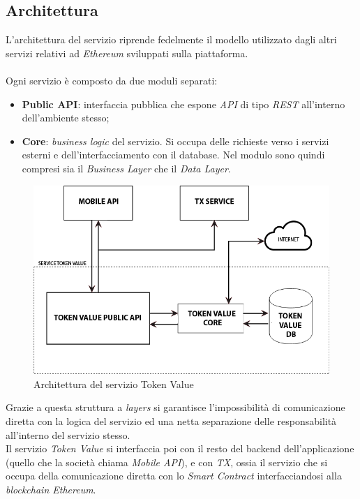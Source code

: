 \documentclass[11pt]{thesistemp}
\begin{document}
\subsection{Architettura}

L'architettura del servizio riprende fedelmente il modello utilizzato dagli altri servizi relativi ad \textit{Ethereum} sviluppati sulla piattaforma.\\\\
Ogni servizio è composto da due moduli separati:
\begin{itemize}
	\item \textbf{Public API}: interfaccia pubblica che espone \textit{API} di tipo \textit{REST} all'interno dell'ambiente stesso;
	\item \textbf{Core}: \textit{business logic} del servizio. Si occupa delle richieste verso i servizi esterni e dell'interfacciamento con il database. Nel modulo sono quindi compresi sia il \textit{Business Layer} che il \textit{Data Layer}.
\end{itemize}
\begin{figure}[h]\hfill
    \centering
    \includegraphics[width=\textwidth]{tkvalue-arch.png}
        \caption{Architettura del servizio Token Value}
    \label{fig:tkvalue-arch}
\end{figure}
Grazie a questa struttura a \textit{layers} si garantisce l'impossibilità di comunicazione diretta con la logica del servizio ed una netta separazione delle responsabilità all'interno del servizio stesso.\\
Il servizio \textit{Token Value} si interfaccia poi con il resto del backend dell'applicazione (quello che la società chiama \textit{Mobile API}), e con \textit{TX}, ossia il servizio che si occupa della comunicazione diretta con lo \textit{Smart Contract} interfacciandosi alla \textit{blockchain Ethereum}.
\end{document}
